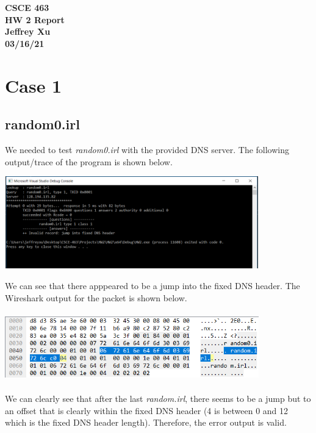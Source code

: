 \documentclass[12pt]{article}
\begin{document}
\begin{center}

{\bf
CSCE 463\\
HW 2 Report\\
Jeffrey Xu\\
03/16/21\\
}

\end{center}

\section{Case 1}

\subsection{random0.irl}

We needed to test \emph{random0.irl} with the provided DNS server. The following output/trace of the program is shown below.

\begin{center}
\includegraphics[width=11cm, height=4cm]{random0.irl}
\end{center}

We can see that there apppeared to be a jump into the fixed DNS header. The Wireshark output for the packet is shown below.

\begin{center}
\includegraphics[width=11cm, height=3cm]{random0.irlWireShark}
\end{center}

We can clearly see that after the last \emph{random.irl}, there seems to be a jump but to an offset that is clearly within the fixed DNS header (4 is between 0 and 12 which is the fixed DNS header length). Therefore, the error output is valid. 
\end{document}
